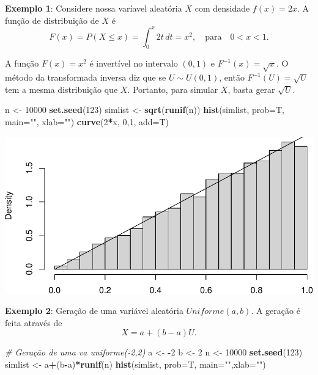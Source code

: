 \documentclass[
]{book}
\newenvironment{Shaded}{\begin{snugshade}}{\end{snugshade}}
\newcommand{\AttributeTok}[1]{\textcolor[rgb]{0.13,0.29,0.53}{#1}}
\newcommand{\CommentTok}[1]{\textcolor[rgb]{0.56,0.35,0.01}{\textit{#1}}}
\newcommand{\DecValTok}[1]{\textcolor[rgb]{0.00,0.00,0.81}{#1}}
\newcommand{\FunctionTok}[1]{\textcolor[rgb]{0.13,0.29,0.53}{\textbf{#1}}}
\newcommand{\NormalTok}[1]{#1}
\newcommand{\OtherTok}[1]{\textcolor[rgb]{0.56,0.35,0.01}{#1}}
\newcommand{\SpecialCharTok}[1]{\textcolor[rgb]{0.81,0.36,0.00}{\textbf{#1}}}
\newcommand{\StringTok}[1]{\textcolor[rgb]{0.31,0.60,0.02}{#1}}
\begin{document}
\textbf{Exemplo 1}: Considere nossa varíavel aleatória \(X\) com densidade
\(f(x)=2x\). A função de distribuição de \(X\) é
\[F(x)=P(X\leq x)=\int_{0}^{x}2t\, dt = x^2, \quad \text{para} \quad 0<x<1.\]

A função \(F(x)=x^2\) é invertível no intervalo \((0,1)\) e
\(F^{-1}(x)=\sqrt{x}\). O método da transformada inversa diz que se
\(U\sim U(0,1)\), então \(F^{-1}(U)=\sqrt{U}\) tem a mesma distribuição que
\(X\). Portanto, para simular \(X\), basta gerar \(\sqrt{U}\).

\begin{Shaded}
\begin{Highlighting}[]
\NormalTok{n }\OtherTok{\textless{}{-}} \DecValTok{10000}
\FunctionTok{set.seed}\NormalTok{(}\DecValTok{123}\NormalTok{)}
\NormalTok{simlist }\OtherTok{\textless{}{-}} \FunctionTok{sqrt}\NormalTok{(}\FunctionTok{runif}\NormalTok{(n))}
\FunctionTok{hist}\NormalTok{(simlist, }\AttributeTok{prob=}\NormalTok{T, }\AttributeTok{main=}\StringTok{""}\NormalTok{, }\AttributeTok{xlab=}\StringTok{""}\NormalTok{)}
\FunctionTok{curve}\NormalTok{(}\DecValTok{2}\SpecialCharTok{*}\NormalTok{x, }\DecValTok{0}\NormalTok{,}\DecValTok{1}\NormalTok{, }\AttributeTok{add=}\NormalTok{T)}
\end{Highlighting}
\end{Shaded}

\includegraphics{introR_files/figure-latex/unnamed-chunk-291-1.pdf}

\textbf{Exemplo 2}: Geração de uma variável aleatória \(Uniforme(a,b)\). A
geração é feita através de \[X = a+(b-a)U.\]

\begin{Shaded}
\begin{Highlighting}[]
\CommentTok{\# Geração de uma va uniforme({-}2,2)}
\NormalTok{a }\OtherTok{\textless{}{-}} \SpecialCharTok{{-}}\DecValTok{2}
\NormalTok{b }\OtherTok{\textless{}{-}} \DecValTok{2}
\NormalTok{n }\OtherTok{\textless{}{-}} \DecValTok{10000}
\FunctionTok{set.seed}\NormalTok{(}\DecValTok{123}\NormalTok{)}
\NormalTok{simlist }\OtherTok{\textless{}{-}}\NormalTok{ a}\SpecialCharTok{+}\NormalTok{(b}\SpecialCharTok{{-}}\NormalTok{a)}\SpecialCharTok{*}\FunctionTok{runif}\NormalTok{(n)}
\FunctionTok{hist}\NormalTok{(simlist, }\AttributeTok{prob=}\NormalTok{T, }\AttributeTok{main=}\StringTok{""}\NormalTok{,}\AttributeTok{xlab=}\StringTok{""}\NormalTok{)}
\end{Highlighting}
\end{Shaded}
\end{document}
